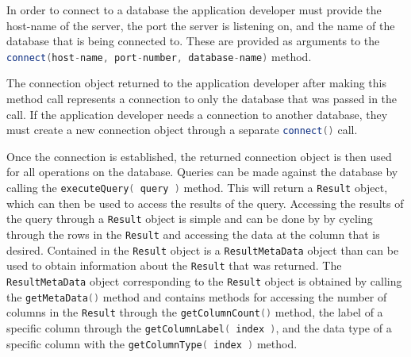 \documentclass[letterpaper, 12pt]{article}
\newcommand{\inlinecode}[1]{\colorbox{codegrey}{\lstinline[language=C++]{#1}}}
\begin{document}
  In order to connect to a database the application developer must provide the
  host-name of the server, the port the server is listening on, and the name of the
  database that is being connected to. These are provided as arguments to the
  \inlinecode{connect(host-name, port-number, database-name)}
  method.
  \par\vspace{\baselineskip}
  The connection object returned to the application developer after making this method
  call represents a connection to only the database that was passed in the call. If the
  application developer needs a connection to another database, they must create a new
  connection object through a separate
  \inlinecode{connect()} call.
  \par\vspace{\baselineskip}
  Once the connection is established, the returned connection object is then used for all
  operations on the database. Queries can be made against the database by calling
  the \inlinecode{executeQuery( query )}
  method. This will return a \inlinecode{Result} object, which can
  then be used to access the results of the query. Accessing the results of the query
  through a \inlinecode{Result} object is simple and can be done by
  by cycling through the rows in the
  \inlinecode{Result} and accessing the data at the column that
  is desired. Contained in the \inlinecode{Result} object is a
  \inlinecode{ResultMetaData} object than can be used to obtain
  information about the \inlinecode{Result} that was returned.
  The \inlinecode{ResultMetaData} object corresponding to the
  \inlinecode{Result} object is obtained by calling the
  \inlinecode{getMetaData()} method and contains
  methods for accessing the number of columns in the
  \inlinecode{Result} through the
  \inlinecode{getColumnCount()} method, the
  label of a specific column through the
  \inlinecode{getColumnLabel( index )},
  and the data type of a specific column with the
  \inlinecode{getColumnType( index )} method.
  \par\vspace{\baselineskip}
  
\end{document}
